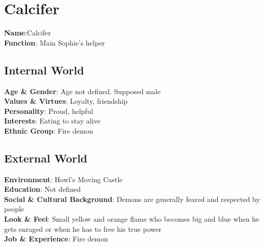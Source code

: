 \section{Calcifer}

\begin{minipage}{0.5\textwidth}
\textbf{Name}:Calcifer \\
\textbf{Function}: Main Sophie's helper

\subsection{Internal World}

\textbf{Age \& Gender}: Age not defined. Supposed male \\
\textbf{Values \& Virtues}: Loyalty, friendship\\
\textbf{Personality}: Proud, helpful \\
\textbf{Interests}: Eating to stay alive\\
\textbf{Ethnic Group}: Fire demon

\subsection{External World}
\textbf{Environment}: Howl’s Moving Castle \\
\textbf{Education}: Not defined \\
\textbf{Social \& Cultural Background}: Demons are generally feared and respected by people \\
\textbf{Look \& Feel}: Small yellow and orange flame who becomes big and  blue when he gets enraged or when he has to free his true power\\
\textbf{Job \& Experience}: Fire demon \\

\end{minipage}%
%
